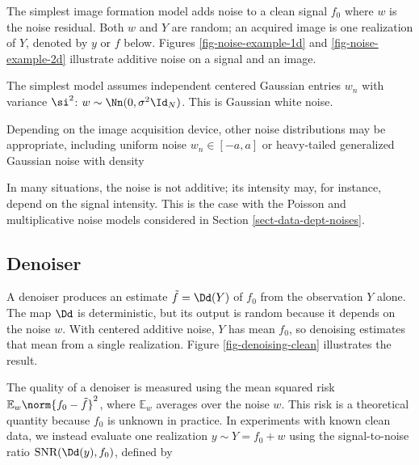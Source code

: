 The simplest image formation model adds noise to a clean signal $f_0$
where $w$ is the noise residual. Both $w$ and $Y$ are random; an acquired image is one realization of $Y$, denoted by $y$ or $f$ below. Figures \ref{fig-noise-example-1d} and \ref{fig-noise-example-2d} illustrate additive noise on a signal and an image.




The simplest model assumes independent centered Gaussian entries $w_n$ with variance $\si^2$: $w\sim\Nn(0,\sigma^2\Id_N)$. This is Gaussian white noise.

Depending on the image acquisition device, other noise distributions may be appropriate, including uniform noise $w_n \in [-a,a]$ or heavy-tailed generalized Gaussian noise with density

In many situations, the noise is not additive; its intensity may, for instance, depend on the signal intensity. This is the case with the Poisson and multiplicative noise models considered in Section \ref{sect-data-dept-noises}.


                                                     
\subsection{Denoiser}

A denoiser produces an estimate $\tilde f = \Dd(Y)$ of $f_0$ from the observation $Y$ alone. The map $\Dd$ is deterministic, but its output is random because it depends on the noise $w$. With centered additive noise, $Y$ has mean $f_0$, so denoising estimates that mean from a single realization. Figure \ref{fig-denoising-clean} illustrates the result.

The quality of a denoiser is measured using the mean squared risk $\mathbb E_w\norm{f_0-\tilde f}^2$,
where $\mathbb E_w$ averages over the noise $w$. This risk is a theoretical quantity because $f_0$ is unknown in practice. In experiments with known clean data, we instead evaluate one realization $y \sim Y = f_0 + w$ using the signal-to-noise ratio $\text{SNR}(\Dd(y),f_0)$, defined by
 
